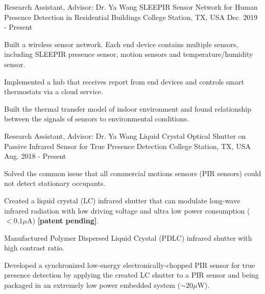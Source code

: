 

\begin{cventries}

  \cventry
    {Research Assistant, Advisor: Dr. Ya Wang} %
    {SLEEPIR Sensor Network for Human Presence Detection in Residential Buildings} %
    {College Station, TX, USA} %
    {Dec. 2019 - Present} %
    {
      \begin{cvitems} %
        \item Built a wireless sensor network. Each end device contains multiple sensors, including SLEEPIR presence sensor, motion sensors and temperature/humidity sensor.
        \item Implemented a hub that receives report from end devices and controls smart thermostats via a cloud service.
        \item Built the thermal transfer model of indoor environment and found relationship between the signals of sensors to environmental conditions.
      \end{cvitems}
    }
  \cventry
    {Research Assistant, Advisor: Dr. Ya Wang} %
    {Liquid Crystal Optical Shutter on Passive Infrared Sensor for True Presence Detection} %
    {College Station, TX, USA} %
    {Aug. 2018 - Present} %
    {
      \begin{cvitems} %
        \item Solved the common issue that all commercial motions sensors (PIR sensors) could not detect stationary occupants.
        \item Created a liquid crystal (LC) infrared shutter that can modulate long-wave infrared radiation with low driving voltage and ultra low power consumption ($<0.1\mu$A) \textbf{[patent pending]}.
        \item Manufactured Polymer Dispersed Liquid Crystal (PDLC) infrared shutter with high contrast ratio.
        \item Developed a synchronized low-energy electronically-chopped PIR sensor for true presence detection by applying the created LC shutter to a PIR sensor and being packaged in an extremely low power embedded system ($\sim20\mu$W).

\end{cvitems}}
\end{cventries}
